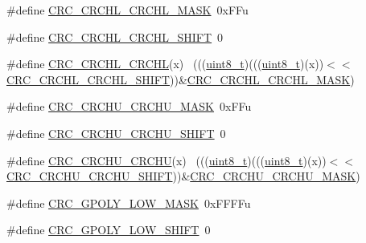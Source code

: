 \begin{DoxyCompactItemize}
\item 
\#define \hyperlink{group___c_r_c___register___masks_ga069f960b90fdbfcfdd0296206592c1b0}{C\+R\+C\+\_\+\+C\+R\+C\+H\+L\+\_\+\+C\+R\+C\+H\+L\+\_\+\+M\+A\+SK}~0x\+F\+Fu
\item 
\#define \hyperlink{group___c_r_c___register___masks_ga0acc1b8a3ef9b7c723d2323af4c20ca4}{C\+R\+C\+\_\+\+C\+R\+C\+H\+L\+\_\+\+C\+R\+C\+H\+L\+\_\+\+S\+H\+I\+FT}~0
\item 
\#define \hyperlink{group___c_r_c___register___masks_gacc352c93802acc0445df3e47f99288ad}{C\+R\+C\+\_\+\+C\+R\+C\+H\+L\+\_\+\+C\+R\+C\+HL}(x)                                          ~(((\hyperlink{_p_e___types_8h_aba7bc1797add20fe3efdf37ced1182c5}{uint8\+\_\+t})(((\hyperlink{_p_e___types_8h_aba7bc1797add20fe3efdf37ced1182c5}{uint8\+\_\+t})(x))$<$$<$\hyperlink{group___c_r_c___register___masks_ga0acc1b8a3ef9b7c723d2323af4c20ca4}{C\+R\+C\+\_\+\+C\+R\+C\+H\+L\+\_\+\+C\+R\+C\+H\+L\+\_\+\+S\+H\+I\+FT}))\&\hyperlink{group___c_r_c___register___masks_ga069f960b90fdbfcfdd0296206592c1b0}{C\+R\+C\+\_\+\+C\+R\+C\+H\+L\+\_\+\+C\+R\+C\+H\+L\+\_\+\+M\+A\+SK})
\item 
\#define \hyperlink{group___c_r_c___register___masks_ga60c0e02d3f331ed438bce87051649186}{C\+R\+C\+\_\+\+C\+R\+C\+H\+U\+\_\+\+C\+R\+C\+H\+U\+\_\+\+M\+A\+SK}~0x\+F\+Fu
\item 
\#define \hyperlink{group___c_r_c___register___masks_ga90800aefc9bc2279fa16af913bbbc634}{C\+R\+C\+\_\+\+C\+R\+C\+H\+U\+\_\+\+C\+R\+C\+H\+U\+\_\+\+S\+H\+I\+FT}~0
\item 
\#define \hyperlink{group___c_r_c___register___masks_gaf83d7187cc7e7ec0ed0df685c6370a08}{C\+R\+C\+\_\+\+C\+R\+C\+H\+U\+\_\+\+C\+R\+C\+HU}(x)                                          ~(((\hyperlink{_p_e___types_8h_aba7bc1797add20fe3efdf37ced1182c5}{uint8\+\_\+t})(((\hyperlink{_p_e___types_8h_aba7bc1797add20fe3efdf37ced1182c5}{uint8\+\_\+t})(x))$<$$<$\hyperlink{group___c_r_c___register___masks_ga90800aefc9bc2279fa16af913bbbc634}{C\+R\+C\+\_\+\+C\+R\+C\+H\+U\+\_\+\+C\+R\+C\+H\+U\+\_\+\+S\+H\+I\+FT}))\&\hyperlink{group___c_r_c___register___masks_ga60c0e02d3f331ed438bce87051649186}{C\+R\+C\+\_\+\+C\+R\+C\+H\+U\+\_\+\+C\+R\+C\+H\+U\+\_\+\+M\+A\+SK})
\item 
\#define \hyperlink{group___c_r_c___register___masks_ga861d4f6f458051a63a7b01e6e5d8794b}{C\+R\+C\+\_\+\+G\+P\+O\+L\+Y\+\_\+\+L\+O\+W\+\_\+\+M\+A\+SK}~0x\+F\+F\+F\+Fu
\item 
\#define \hyperlink{group___c_r_c___register___masks_ga3830f95399bd5190027aaf00f307d10b}{C\+R\+C\+\_\+\+G\+P\+O\+L\+Y\+\_\+\+L\+O\+W\+\_\+\+S\+H\+I\+FT}~0

\end{DoxyCompactItemize}
